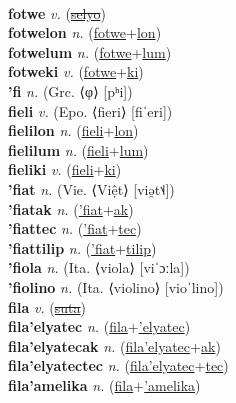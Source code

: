  \label{fotluki} \\
\textbf{fotwe} \textit{v.} (\hyperref[selyo]{\sout{selyo}})
 \label{fotwe} \\
\textbf{fotwelon} \textit{n.} (\hyperref[fotwe]{fotwe}+\hyperref[lon]{lon})
 \label{fotwelon} \\
\textbf{fotwelum} \textit{n.} (\hyperref[fotwe]{fotwe}+\hyperref[lum]{lum})
 \label{fotwelum} \\
\textbf{fotweki} \textit{v.} (\hyperref[fotwe]{fotwe}+\hyperref[ki]{ki})
 \label{fotweki} \\
\textbf{'fi} \textit{n.} (Grc. ⟨φ⟩ [pʰi])
 \label{'fi} \\
\textbf{fieli} \textit{v.} (Epo. ⟨fieri⟩ [fiˈeri])
 \label{fieli} \\
\textbf{fielilon} \textit{n.} (\hyperref[fieli]{fieli}+\hyperref[lon]{lon})
 \label{fielilon} \\
\textbf{fielilum} \textit{n.} (\hyperref[fieli]{fieli}+\hyperref[lum]{lum})
 \label{fielilum} \\
\textbf{fieliki} \textit{v.} (\hyperref[fieli]{fieli}+\hyperref[ki]{ki})
 \label{fieliki} \\
\textbf{'fiat} \textit{n.} (Vie. ⟨Việt⟩ [viə̯t˦˨])
 \label{'fiat} \\
\textbf{'fiatak} \textit{n.} (\hyperref['fiat]{'fiat}+\hyperref[ak]{ak})
 \label{'fiatak} \\
\textbf{'fiattec} \textit{n.} (\hyperref['fiat]{'fiat}+\hyperref[tec]{tec})
 \label{'fiattec} \\
\textbf{'fiattilip} \textit{n.} (\hyperref['fiat]{'fiat}+\hyperref[tilip]{tilip})
 \label{'fiattilip} \\
\textbf{'fiola} \textit{n.} (Ita. ⟨viola⟩ [viˈɔːla])
 \label{'fiola} \\
\textbf{'fiolino} \textit{n.} (Ita. ⟨violino⟩ [vioˈlino])
 \label{'fiolino} \\
\textbf{fila} \textit{v.} (\hyperref[suta]{\sout{suta}})
 \label{fila} \\
\textbf{fila'elyatec} \textit{n.} (\hyperref[fila]{fila}+\hyperref['elyatec]{'elyatec})
 \label{fila'elyatec} \\
\textbf{fila'elyatecak} \textit{n.} (\hyperref[fila'elyatec]{fila'elyatec}+\hyperref[ak]{ak})
 \label{fila'elyatecak} \\
\textbf{fila'elyatectec} \textit{n.} (\hyperref[fila'elyatec]{fila'elyatec}+\hyperref[tec]{tec})
 \label{fila'elyatectec} \\
\textbf{fila'amelika} \textit{n.} (\hyperref[fila]{fila}+\hyperref['amelika]{'amelika})
